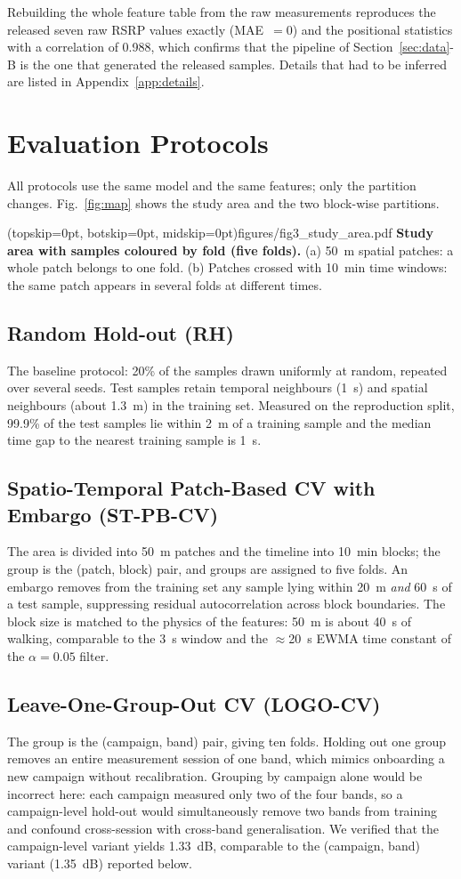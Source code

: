 \documentclass{ieeeaccess}
\begin{document}
Rebuilding the whole feature table from the raw measurements reproduces the
released seven raw RSRP values exactly (MAE~$=0$) and the positional statistics
with a correlation of 0.988, which confirms that the pipeline of
Section~\ref{sec:data}-B is the one that generated the released samples. Details
that had to be inferred are listed in Appendix~\ref{app:details}.

\section{Evaluation Protocols}
\label{sec:protocol}
All protocols use the same model and the same features; only the partition
changes. Fig.~\ref{fig:map} shows the study area and the two block-wise
partitions.

\Figure[t!](topskip=0pt, botskip=0pt, midskip=0pt){figures/fig3_study_area.pdf}
{\textbf{Study area with samples coloured by fold (five folds).} (a) 50~m spatial
patches: a whole patch belongs to one fold. (b) Patches crossed with 10~min time
windows: the same patch appears in several folds at different times.\label{fig:map}}

\subsection{Random Hold-out (RH)}
The baseline protocol: 20\% of the samples drawn uniformly at random, repeated
over several seeds. Test samples retain temporal neighbours (1~s) and spatial
neighbours (about 1.3~m) in the training set. Measured on the reproduction split,
99.9\% of the test samples lie within 2~m of a training sample and the median
time gap to the nearest training sample is 1~s.

\subsection{Spatio-Temporal Patch-Based CV with Embargo (ST-PB-CV)}
The area is divided into 50~m patches and the timeline into 10~min blocks; the
group is the (patch, block) pair, and groups are assigned to five folds. An
embargo removes from the training set any sample lying within 20~m \emph{and}
60~s of a test sample, suppressing residual autocorrelation across block
boundaries. The block size is matched to the physics of the features: 50~m is
about 40~s of walking, comparable to the 3~s window and the $\approx$20~s EWMA
time constant of the $\alpha=0.05$ filter.

\subsection{Leave-One-Group-Out CV (LOGO-CV)}
The group is the (campaign, band) pair, giving ten folds. Holding out one group
removes an entire measurement session of one band, which mimics onboarding a new
campaign without recalibration. Grouping by campaign alone would be incorrect
here: each campaign measured only two of the four bands, so a campaign-level
hold-out would simultaneously remove two bands from training and confound
cross-session with cross-band generalisation. We verified that the campaign-level
variant yields 1.33~dB, comparable to the (campaign, band) variant (1.35~dB) reported
below.
\end{document}
